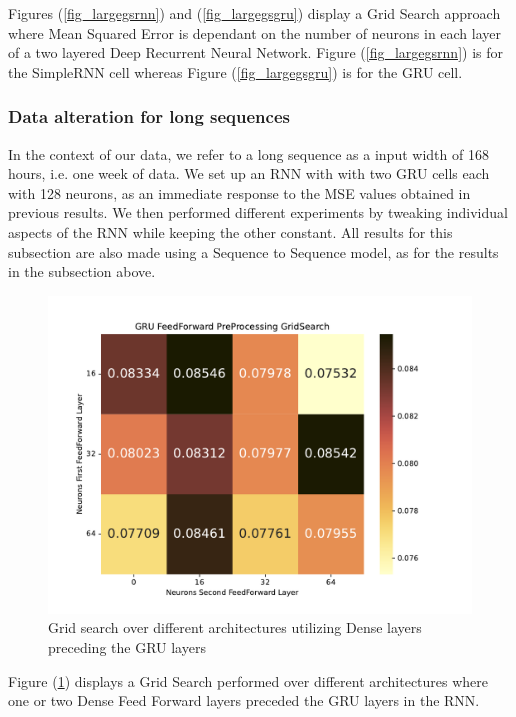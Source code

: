 \documentclass
[twocolumn,
secnumarabic,
nobibnotes,
aps,
prl,
reprint,
groupedaddress,
amsmath,
amssymb,
]{revtex4-2}
\begin{document}
Figures (\ref{fig_largegsrnn}) and (\ref{fig_largegsgru}) display a Grid Search approach where Mean Squared Error is dependant on the number of neurons in each layer of a two layered Deep Recurrent Neural Network. Figure (\ref{fig_largegsrnn}) is for the SimpleRNN cell whereas Figure (\ref{fig_largegsgru}) is for the GRU cell. 

\subsubsection{Data alteration for long sequences}
In the context of our data, we refer to a long sequence as a input width of 168 hours, i.e. one week of data. We set up an RNN with with two GRU cells each with 128 neurons, as an immediate response to the MSE values obtained in previous results. We then performed different experiments by tweaking individual aspects of the RNN while keeping the other constant. All results for this subsection are also made using a Sequence to Sequence model, as for the results in the subsection above.

\begin{figure}
  \includegraphics[width=\columnwidth]{figures/Large_forecast_ff_gridsearch_gru.pdf}
  \caption{\label{fig_gsff}Grid search over different architectures utilizing Dense layers preceding the GRU layers}
\end{figure}

Figure (\ref{fig_gsff}) displays a Grid Search performed over different architectures where one or two Dense Feed Forward layers preceded the GRU layers in the RNN.
\end{document}
